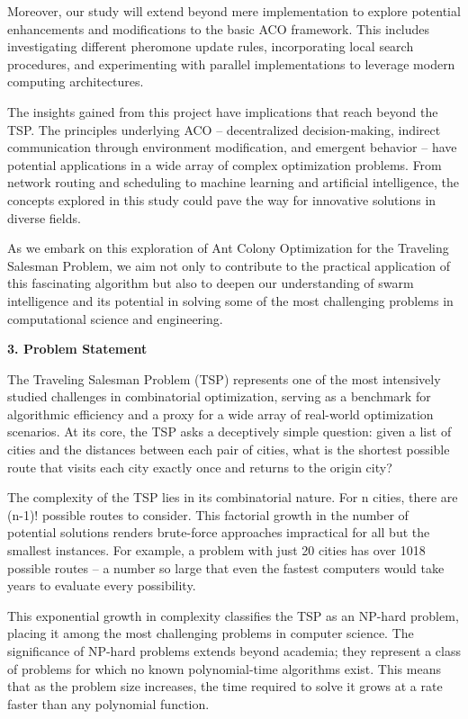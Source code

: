 \documentclass[
]{article}
\begin{document}
Moreover, our study will extend beyond mere implementation to explore
potential enhancements and modifications to the basic ACO framework.
This includes investigating different pheromone update rules,
incorporating local search procedures, and experimenting with parallel
implementations to leverage modern computing architectures.

The insights gained from this project have implications that reach
beyond the TSP. The principles underlying ACO -- decentralized
decision-making, indirect communication through environment
modification, and emergent behavior -- have potential applications in a
wide array of complex optimization problems. From network routing and
scheduling to machine learning and artificial intelligence, the concepts
explored in this study could pave the way for innovative solutions in
diverse fields.

As we embark on this exploration of Ant Colony Optimization for the
Traveling Salesman Problem, we aim not only to contribute to the
practical application of this fascinating algorithm but also to deepen
our understanding of swarm intelligence and its potential in solving
some of the most challenging problems in computational science and
engineering.

\textbf{3. Problem Statement}

The Traveling Salesman Problem (TSP) represents one of the most
intensively studied challenges in combinatorial optimization, serving as
a benchmark for algorithmic efficiency and a proxy for a wide array of
real-world optimization scenarios. At its core, the TSP asks a
deceptively simple question: given a list of cities and the distances
between each pair of cities, what is the shortest possible route that
visits each city exactly once and returns to the origin city?

The complexity of the TSP lies in its combinatorial nature. For n
cities, there are (n-1)! possible routes to consider. This factorial
growth in the number of potential solutions renders brute-force
approaches impractical for all but the smallest instances. For example,
a problem with just 20 cities has over 1018 possible routes -- a number
so large that even the fastest computers would take years to evaluate
every possibility.

This exponential growth in complexity classifies the TSP as an NP-hard
problem, placing it among the most challenging problems in computer
science. The significance of NP-hard problems extends beyond academia;
they represent a class of problems for which no known polynomial-time
algorithms exist. This means that as the problem size increases, the
time required to solve it grows at a rate faster than any polynomial
function.
\end{document}
